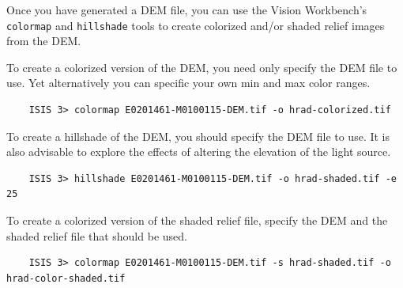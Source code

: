%

Once you have generated a \ac{DEM} file, you can use the Vision Workbench's
\texttt{colormap} and \texttt{hillshade} tools to create colorized
and/or shaded relief images from the \ac{DEM}.

To create a colorized version of the \ac{DEM}, you need only specify the
\ac{DEM} file to use. Yet alternatively you can specific your own min and
max color ranges.

\begin{verbatim}
    ISIS 3> colormap E0201461-M0100115-DEM.tif -o hrad-colorized.tif
\end{verbatim}

To create a hillshade of the \ac{DEM}, you should specify the \ac{DEM} file
to use. It is also advisable to explore the effects of altering the
elevation of the light source.

\begin{verbatim}
    ISIS 3> hillshade E0201461-M0100115-DEM.tif -o hrad-shaded.tif -e 25
\end{verbatim}

To create a colorized version of the shaded relief file, specify
the \ac{DEM} and the shaded relief file that should be used.

\begin{verbatim}
    ISIS 3> colormap E0201461-M0100115-DEM.tif -s hrad-shaded.tif -o hrad-color-shaded.tif
\end{verbatim}

